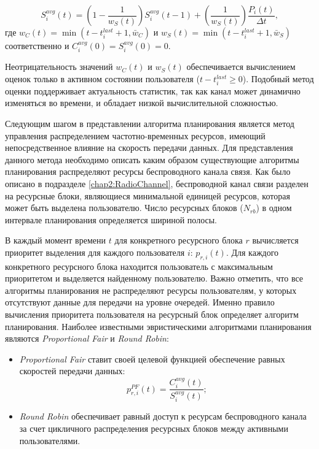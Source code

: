 \begin{equation}
\label{eq:SEstimation}
S_i^{avg}(t) = \left(1 - \frac{1}{w_{S}(t)}\right)S_i^{avg}(t - 1) + \left(\frac{1}{w_{S}(t)}\right)\frac{P_i(t)}{\Delta t},\end{equation}
где $w_{C}(t) = \min (t - t_i^{last} + 1, \bar{w}_{C})$ и $w_{S}(t) = \min (t - t_i^{last} + 1, \bar{w}_{S})$  соответственно и $C_i^{avg}(0) = S_i^{avg}(0) = 0$.

Неотрицательность значений $w_{C}(t)$ и $w_{S}(t)$ обеспечивается вычислением оценок только в активном состоянии пользователя ($t - t_i^{last} \geq 0$). Подобный метод оценки поддерживает актуальность статистик, так как канал может динамично изменяться во времени, и обладает низкой вычислительной сложностью.

Следующим шагом в представлении алгоритма планирования является метод управления распределением частотно-временных ресурсов, имеющий непосредственное влияние на скорость передачи данных. Для представления данного метода необходимо описать каким образом существующие алгоритмы планирования распределяют ресурсы беспроводного канала связя. Как было описано в подразделе \ref{chap2:RadioChannel}, беспроводной канал связи разделен на ресурсные блоки, являющиеся минимальной единицей ресурсов, которая может быть выделена пользователю. Число ресурсных блоков ($N_{rb}$) в одном интервале планирования определяется шириной полосы.

В каждый момент времени $t$ для конкретного ресурсного блока $r$ вычисляется приоритет выделения для каждого пользователя $i$: $p_{r,i}(t)$. Для каждого конкретного ресурсного блока находится пользователь с максимальным приоритетом и выделяется найденному пользователю. Важно отметить, что все алгоритмы планирования не распределяют ресурсы пользователям, у которых отсутствуют данные для передачи на уровне очередей. Именно правило вычисления приоритета пользователя на ресурсный блок определяет алгоритм планирования. Наиболее известными эвристическими алгоритмами планирования являются \textit{Proportional Fair} и \textit{Round Robin}:
\begin{itemize}
	\item \textit{Proportional Fair} ставит своей целевой функцией обеспечение равных скоростей передачи данных:
	$$p^{PF}_{r,i}(t) = \frac{C_i^{avg}(t)}{S_i^{avg}(t)};$$
	\item \textit{Round Robin} обеспечивает равный доступ к ресурсам беспроводного канала за счет цикличного распределения ресурсных блоков между активными пользователями.
\end{itemize}

